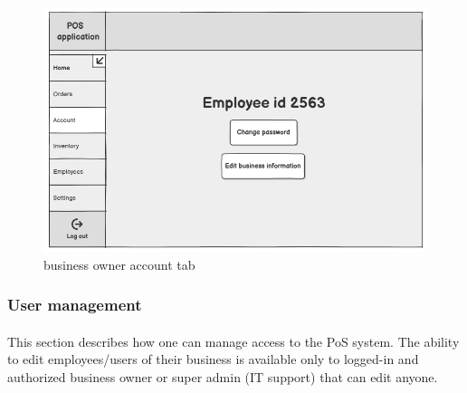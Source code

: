 \documentclass{article}
\begin{document}
    \begin{figure}[H]
        \centering
        \includegraphics[width=0.9\linewidth]{PSP/lab-1/mockups/account.png}
        \caption{business owner account tab}
        \label{}
    \end{figure}

     
    \subsubsection{User management}
    \paragraph{}This section describes how one can manage access to the PoS system. The ability to edit employees/users of their business is available only to logged-in and authorized business owner or super admin (IT support) that can edit anyone.
\end{document}
